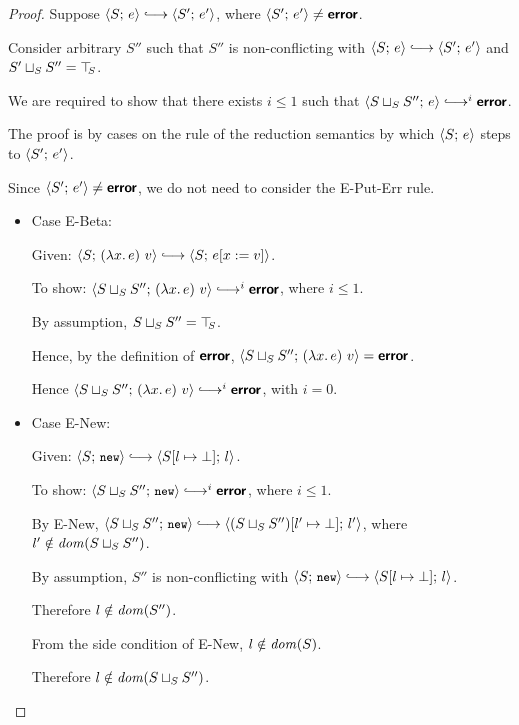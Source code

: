 \begin{proof}
  Suppose $\config{S}{e} \parstepsto \config{S'}{e'}$, where
  $\langle S';\, e' \rangle \neq \textbf{\textsf{error}}$.

  Consider arbitrary $S''$ such that $S''$ is non-conflicting with
  $\config{S}{e} \parstepsto \config{S'}{e'}$ and $S' \sqcup_{S} S''
  = \top\hspace{-0.85mm}_{S}$.
  
  We are required to show that there exists $i \leq 1$ such that
  $\config{\lubstore{S}{S''}}{e} \parstepsto^i \error$.

  The proof is by cases on the rule of the reduction semantics by
  which $\langle S;\, e \rangle$ steps to $\langle S';\, e' \rangle$.

  Since $\langle S';\, e' \rangle \neq \textbf{\textsf{error}}$, we do not need to consider the
  {\sc E-Put-Err} rule.
  \begin{itemize}

  \item Case {\sc E-Beta}:

    Given: $\config{S}{\app{(\lam{x}{e})}{v}} \parstepsto
    \config{S}{\subst{e}{x}{v}}$.

    To show: $\config{\lubstore{S}{S''}}{\app{(\lam{x}{e})}{v}}
    \parstepsto^i \error$, where $i \leq 1$.

    By assumption, $S \sqcup_{S} S'' = \top\hspace{-0.85mm}_{S}$.

    Hence, by the definition of $\textbf{\textsf{error}}$,
    $\langle S \sqcup_{S} S'';\, (\lambda x.\,e)~v \rangle = \textbf{\textsf{error}}$.

    Hence $\config{\lubstore{S}{S''}}{\app{(\lam{x}{e})}{v}}
    \parstepsto^i \error$, with $i = 0$.

  \item Case {\sc E-New}:

    Given: $\config{S}{\NEW} \parstepsto
    \config{\extSRaw{S}{l}{\bot}}{l}$.

    To show: $\config{\lubstore{S}{S''}}{\NEW} \parstepsto^i
    \error$, where $i \leq 1$.

    By {\sc E-New}, $\config{\lubstore{S}{S''}}{\NEW} \parstepsto
    \config{\extSRaw{(\lubstore{S}{S''})}{l'}{\bot}}{l'}$, where $l'
    \notin \mathit{dom}(S \sqcup_{S} S'')$.

    By assumption, $S''$ is non-conflicting with $\config{S}{\NEW}
    \parstepsto \config{\extSRaw{S}{l}{\bot}}{l}$.
    
    Therefore $l \notin \mathit{dom}(S'')$.

    From the side condition of {\sc E-New}, $l \notin \mathit{dom}(S)$.

    Therefore $l \notin \mathit{dom}(S \sqcup_{S} S'')$.


\end{itemize}
\end{proof}
